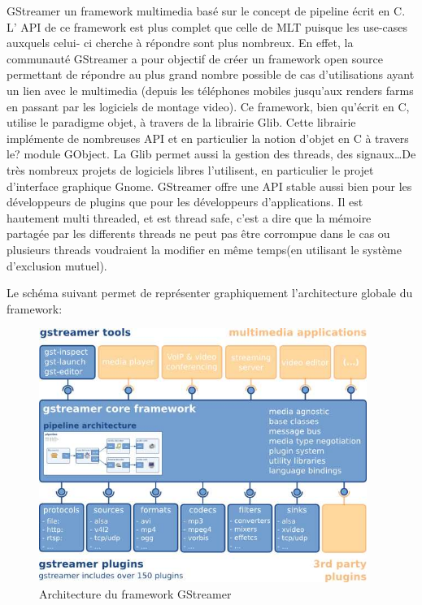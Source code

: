 GStreamer un framework multimedia basé sur le concept de pipeline
écrit en C.  L' API de ce framework est plus complet que celle de
MLT puisque les use-cases auxquels celui- ci cherche à répondre sont
plus nombreux. En effet, la communauté GStreamer a pour objectif de
créer un framework open source permettant de répondre au plus grand
nombre possible de cas d'utilisations ayant un lien avec le multimedia
(depuis les téléphones mobiles jusqu'aux renders farms en passant par les
logiciels de montage video).  Ce framework, bien qu'écrit en C,
utilise le paradigme objet, à travers de la librairie Glib. Cette
librairie implémente de nombreuses API et en particulier la notion
d'objet en C à travers le? module GObject. La Glib permet aussi la
gestion des threads, des signaux\ldots De très nombreux projets
de logiciels libres l'utilisent, en particulier le projet d'interface
graphique Gnome. GStreamer offre une API stable aussi bien pour les
développeurs de plugins que pour les développeurs d'applications. Il
est hautement multi threaded, et est thread safe,
c'est a dire que la mémoire partagée par les differents threads ne
peut pas être corrompue dans le cas ou plusieurs threads voudraient la modifier
en même temps(en utilisant le système d'exclusion mutuel).

Le schéma suivant permet de représenter graphiquement l'architecture
globale du framework:

\begin{figure} [H]

  \begin{center}

    \includegraphics[width=0.95\textwidth]{images/gstoverview}

  \end{center}

  \caption{Architecture du framework GStreamer}

  \label{Yes}

\end{figure}

